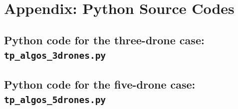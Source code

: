 
\chapter*{Appendix: Python Source Codes}

\section*{Python code for the three-drone case: \texttt{tp\_algos\_3drones.py}}



\section*{Python code for the five-drone case: \texttt{tp\_algos\_5drones.py}}

